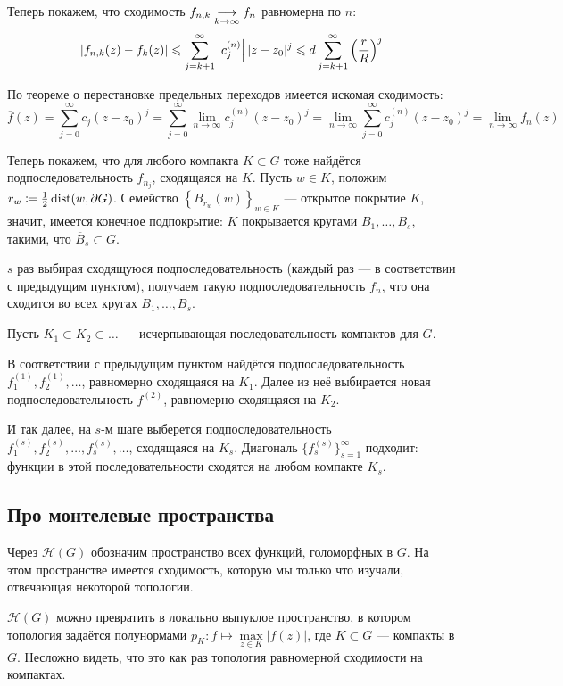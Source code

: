 \documentclass[a4paper]{report}
\begin{document}
{{{{    Теперь покажем, что сходимость $f_{n,k} \underset{k \to \infty}{\longrightarrow} f_n$ равномерна по $n$:
    \[\left|f_{n,k}(z) - f_k(z)\right| \leqslant \sum\limits_{j = k + 1}^{\infty}\left|c_j^{(n)}\right||z - z_0|^j \leqslant d\sum\limits_{j = k + 1}^{\infty}\left(\frac{r}{R}\right)^j\]
    \item По теореме о перестановке предельных переходов имеется искомая сходимость: \[\overline{f}(z) = \sum\limits_{j = 0}^{\infty}c_j (z - z_0)^{j} = \sum\limits_{j = 0}^{\infty}\lim\limits_{n \to \infty}c_j^{(n)} (z - z_0)^{j} = \lim\limits_{n \to \infty}\sum\limits_{j = 0}^{\infty}c_j^{(n)} (z - z_0)^{j} = \lim\limits_{n \to \infty} f_n(z)\]
    }
    \item Теперь покажем, что для любого компакта $K \subset G$ тоже найдётся подпоследовательность $f_{n_j}$, сходящаяся на $K$.
    Пусть $w \in K$, положим $r_w \coloneqq \frac{1}{2}\operatorname{dist}(w, \partial G)$.
        Семейство $\left\{B_{r_w}(w)\right\}_{w \in K}$ --- открытое покрытие $K$, значит, имеется конечное подпокрытие: $K$ покрывается кругами $B_1, \dots, B_s$, такими, что $\overline{B}_s \subset G$.

    $s$ раз выбирая сходящуюся подпоследовательность (каждый раз --- в соответствии с предыдущим пунктом), получаем такую подпоследовательность $f_n$, что она сходится во всех кругах $B_1, \dots, B_s$.
    \item Пусть $K_1 \subset K_2 \subset \dots$ --- исчерпывающая последовательность компактов для $G$.

    В соответствии с предыдущим пунктом найдётся подпоследовательность $f_1^{(1)}, f_2^{(1)}, \dots$, равномерно сходящаяся на $K_1$.
    Далее из неё выбирается новая подпоследовательность $f^{(2)}$, равномерно сходящаяся на $K_2$.

    И так далее, на $s$-м шаге выберется подпоследовательность $f^{(s)}_1, f^{(s)}_2, \dots, f^{(s)}_s, \dots$, сходящаяся на $K_s$.
    Диагональ $\{f_s^{(s)}\}_{s = 1}^{\infty}$ подходит: функции в этой последовательности сходятся на любом компакте $K_s$.\qedhere
    }
    }
    }
    \subsection{Про монтелевые пространства}
    Через $\mathcal{H}(G)$ обозначим пространство всех функций, голоморфных в $G$.
    На этом пространстве имеется сходимость, которую мы только что изучали, отвечающая некоторой топологии.

    $\mathcal{H}(G)$ можно превратить в локально выпуклое пространство, в котором топология задаётся полунормами $p_K: f \mapsto \max\limits_{z \in K}|f(z)|$, где $K \subset G$ --- компакты в $G$.
    Несложно видеть, что это как раз топология равномерной сходимости на компактах.
\end{document}
